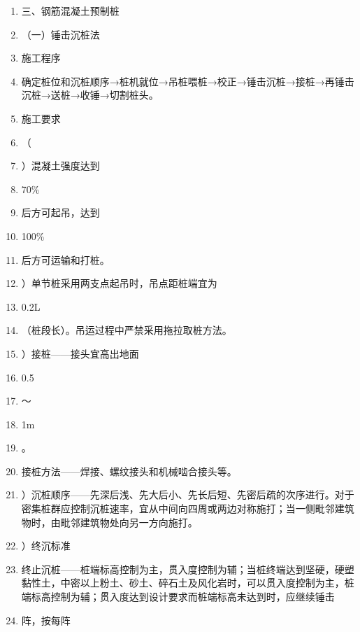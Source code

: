 \documentclass[UTF8,fontset=fandol,11pt]{ctexart}
\begin{document}
\begin{enumerate}[label=\arabic*.]

\item 三、钢筋混凝土预制桩

\item （一）锤击沉桩法

\item 施工程序

\item 确定桩位和沉桩顺序→桩机就位→吊桩喂桩→校正→锤击沉桩→接桩→再锤击沉桩→送桩→收锤→切割桩头。

\item 施工要求

\item （

\item ）混凝土强度达到

\item 70\%

\item 后方可起吊，达到

\item 100\%

\item 后方可运输和打桩。

\item ）单节桩采用两支点起吊时，吊点距桩端宜为

\item 0.2L

\item （桩段长）。吊运过程中严禁采用拖拉取桩方法。

\item ）接桩——接头宜高出地面

\item 0.5

\item ～

\item 1m

\item 。

\item 接桩方法——焊接、螺纹接头和机械啮合接头等。

\item ）沉桩顺序——先深后浅、先大后小、先长后短、先密后疏的次序进行。对于密集桩群应控制沉桩速率，宜从中间向四周或两边对称施打；当一侧毗邻建筑物时，由毗邻建筑物处向另一方向施打。

\item ）终沉标准

\item 终止沉桩——桩端标高控制为主，贯入度控制为辅；当桩终端达到坚硬，硬塑黏性土，中密以上粉土、砂土、碎石土及风化岩时，可以贯入度控制为主，桩端标高控制为辅；贯入度达到设计要求而桩端标高未达到时，应继续锤击

\item 阵，按每阵

\end{enumerate}
\end{document}
